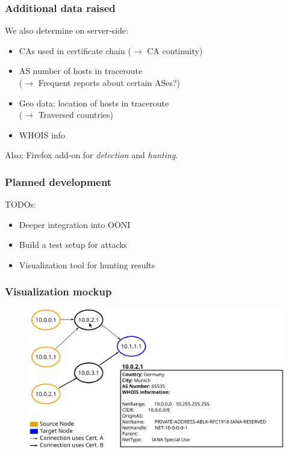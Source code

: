 \begin{frame}
  \frametitle{Additional data raised}
  \begin{block}{We also determine on server-side:}
    \begin{itemize}
    \item CAs used in certificate chain ($\rightarrow$ CA continuity)
    \item AS number of hosts in traceroute \\ ($\rightarrow$ Frequent
      reports about certain ASes?)
    \item Geo data: location of hosts in traceroute \\ ($\rightarrow$ Traversed countries)
    \item WHOIS info
    \end{itemize}
  \end{block}

  Also: Firefox add-on for \textit{detection} and \textit{hunting}.
\end{frame}

\begin{frame}
  \frametitle{Planned development}
  \begin{block}{TODOs:}
    \begin{itemize}
    \item Deeper integration into OONI
    \item Build a test setup for attacks
    \item Visualization tool for hunting results
    \end{itemize}
  \end{block}
\end{frame}

\begin{frame}
  \frametitle{Visualization mockup}
  \begin{figure}[t]
    \centering
    \includegraphics[scale=.36]{figures/Mockup-1}
  \end{figure}
\end{frame}

